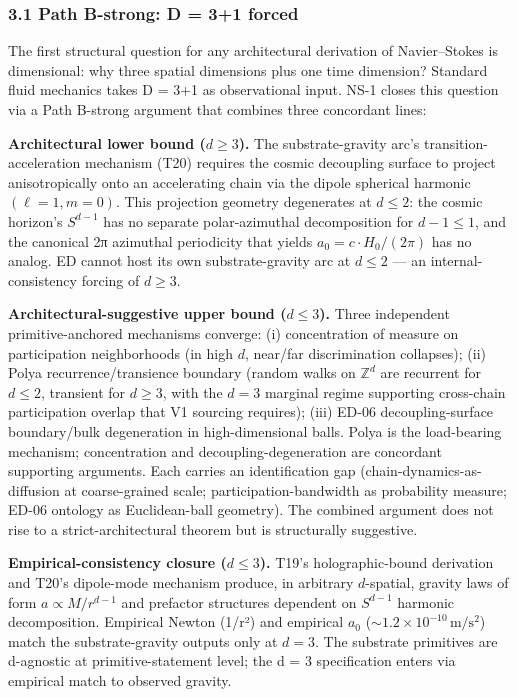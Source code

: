 \documentclass[
]{article}
\begin{document}
\subsubsection{3.1 Path B-strong: D = 3+1
forced}\label{path-b-strong-d-31-forced}

The first structural question for any architectural derivation of
Navier--Stokes is dimensional: why three spatial dimensions plus one
time dimension? Standard fluid mechanics takes D = 3+1 as observational
input. NS-1 closes this question via a Path B-strong argument that
combines three concordant lines:

\textbf{Architectural lower bound (\(d \ge 3\)).} The substrate-gravity
arc's transition-acceleration mechanism (T20) requires the cosmic
decoupling surface to project anisotropically onto an accelerating chain
via the dipole spherical harmonic \((\ell = 1, m = 0)\). This projection
geometry degenerates at \(d \le 2\): the cosmic horizon's \(S^{d-1}\)
has no separate polar-azimuthal decomposition for \(d - 1 \le 1\), and
the canonical 2π azimuthal periodicity that yields
\(a_0 = c \cdot H_0/(2\pi)\) has no analog. ED cannot host its own
substrate-gravity arc at \(d \le 2\) --- an internal-consistency forcing
of \(d \ge 3\).

\textbf{Architectural-suggestive upper bound (\(d \le 3\)).} Three
independent primitive-anchored mechanisms converge: (i) concentration of
measure on participation neighborhoods (in high \(d\), near/far
discrimination collapses); (ii) Polya recurrence/transience boundary
(random walks on \(\mathbb{Z}^d\) are recurrent for \(d \le 2\),
transient for \(d \ge 3\), with the \(d = 3\) marginal regime supporting
cross-chain participation overlap that V1 sourcing requires); (iii)
ED-06 decoupling-surface boundary/bulk degeneration in high-dimensional
balls. Polya is the load-bearing mechanism; concentration and
decoupling-degeneration are concordant supporting arguments. Each
carries an identification gap (chain-dynamics-as-diffusion at
coarse-grained scale; participation-bandwidth as probability measure;
ED-06 ontology as Euclidean-ball geometry). The combined argument does
not rise to a strict-architectural theorem but is structurally
suggestive.

\textbf{Empirical-consistency closure (\(d \le 3\)).} T19's
holographic-bound derivation and T20's dipole-mode mechanism produce, in
arbitrary \(d\)-spatial, gravity laws of form \(a \propto M/r^{d-1}\)
and prefactor structures dependent on \(S^{d-1}\) harmonic
decomposition. Empirical Newton (1/r²) and empirical \(a_0\)
(\(\sim 1.2 \times 10^{-10}\,\mathrm{m/s^2}\)) match the
substrate-gravity outputs only at \(d = 3\). The substrate primitives
are d-agnostic at primitive-statement level; the d = 3 specification
enters via empirical match to observed gravity.
\end{document}
